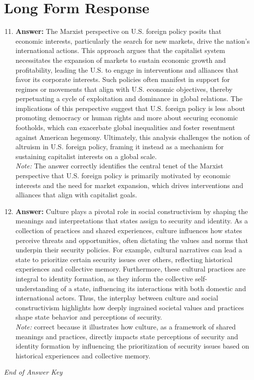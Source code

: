 \documentclass[12pt]{article}
\begin{document}
\section*{Long Form Response}
\begin{enumerate}[label=\arabic*.]
\setcounter{enumi}{10}
\item \textbf{Answer:} The Marxist perspective on U.S. foreign policy posits that economic interests, particularly the search for new markets, drive the nation's international actions. This approach argues that the capitalist system necessitates the expansion of markets to sustain economic growth and profitability, leading the U.S. to engage in interventions and alliances that favor its corporate interests. Such policies often manifest in support for regimes or movements that align with U.S. economic objectives, thereby perpetuating a cycle of exploitation and dominance in global relations. The implications of this perspective suggest that U.S. foreign policy is less about promoting democracy or human rights and more about securing economic footholds, which can exacerbate global inequalities and foster resentment against American hegemony. Ultimately, this analysis challenges the notion of altruism in U.S. foreign policy, framing it instead as a mechanism for sustaining capitalist interests on a global scale.
\\ \textit{Note:} The answer correctly identifies the central tenet of the Marxist perspective that U.S. foreign policy is primarily motivated by economic interests and the need for market expansion, which drives interventions and alliances that align with capitalist goals.
\item \textbf{Answer:} Culture plays a pivotal role in social constructivism by shaping the meanings and interpretations that states assign to security and identity. As a collection of practices and shared experiences, culture influences how states perceive threats and opportunities, often dictating the values and norms that underpin their security policies. For example, cultural narratives can lead a state to prioritize certain security issues over others, reflecting historical experiences and collective memory. Furthermore, these cultural practices are integral to identity formation, as they inform the collective self- understanding of a state, influencing its interactions with both domestic and international actors. Thus, the interplay between culture and social constructivism highlights how deeply ingrained societal values and practices shape state behavior and perceptions of security.
\\ \textit{Note:} correct because it illustrates how culture, as a framework of shared meanings and practices, directly impacts state perceptions of security and identity formation by influencing the prioritization of security issues based on historical experiences and collective memory.
\end{enumerate}

\vfill
\noindent\textit{End of Answer Key}
\end{document}
